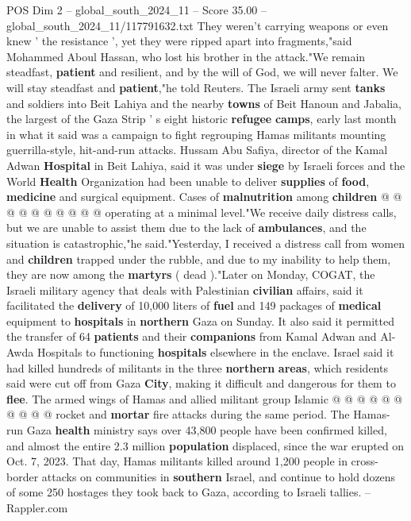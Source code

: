 \begin{textsample}{POS Dim 2 – global\_south\_2024\_11 – Score 35.00 – global\_south\_2024\_11/117791632.txt}
They weren't carrying weapons or even knew ' the resistance ', yet they were ripped apart into fragments,"said Mohammed Aboul Hassan, who lost his brother in the attack."We remain steadfast, \textbf{patient} and resilient, and by the will of God, we will never falter.
We will stay steadfast and \textbf{patient},"he told Reuters.
The Israeli army sent \textbf{tanks} and soldiers into Beit Lahiya and the nearby \textbf{towns} of Beit Hanoun and Jabalia, the largest of the Gaza Strip ' s eight historic \textbf{refugee} \textbf{camps}, early last month in what it said was a campaign to fight regrouping Hamas militants mounting guerrilla-style, hit-and-run attacks.
Hussam Abu Safiya, director of the Kamal Adwan \textbf{Hospital} in Beit Lahiya, said it was under \textbf{siege} by Israeli forces and the World \textbf{Health} Organization had been unable to deliver \textbf{supplies} of \textbf{food}, \textbf{medicine} and surgical equipment.
Cases of \textbf{malnutrition} among \textbf{children} @ @ @ @ @ @ @ @ @ @ operating at a minimal level."We receive daily distress calls, but we are unable to assist them due to the lack of \textbf{ambulances}, and the situation is catastrophic,"he said."Yesterday, I received a distress call from women and \textbf{children} trapped under the rubble, and due to my inability to help them, they are now among the \textbf{martyrs} ( dead )."Later on Monday, COGAT, the Israeli military agency that deals with Palestinian \textbf{civilian} affairs, said it facilitated the \textbf{delivery} of 10,000 liters of \textbf{fuel} and 149 packages of \textbf{medical} equipment to \textbf{hospitals} in \textbf{northern} Gaza on Sunday.
It also said it permitted the transfer of 64 \textbf{patients} and their \textbf{companions} from Kamal Adwan and Al-Awda Hospitals to functioning \textbf{hospitals} elsewhere in the enclave.
Israel said it had killed hundreds of militants in the three \textbf{northern} \textbf{areas}, which residents said were cut off from Gaza \textbf{City}, making it difficult and dangerous for them to \textbf{flee}.
The armed wings of Hamas and allied militant group Islamic @ @ @ @ @ @ @ @ @ @ rocket and \textbf{mortar} fire attacks during the same period.
The Hamas-run Gaza \textbf{health} ministry says over 43,800 people have been confirmed killed, and almost the entire 2.3 million \textbf{population} displaced, since the war erupted on Oct. 7, 2023.
That day, Hamas militants killed around 1,200 people in cross-border attacks on communities in \textbf{southern} Israel, and continue to hold dozens of some 250 hostages they took back to Gaza, according to Israeli tallies. -- Rappler.com

\end{textsample}
